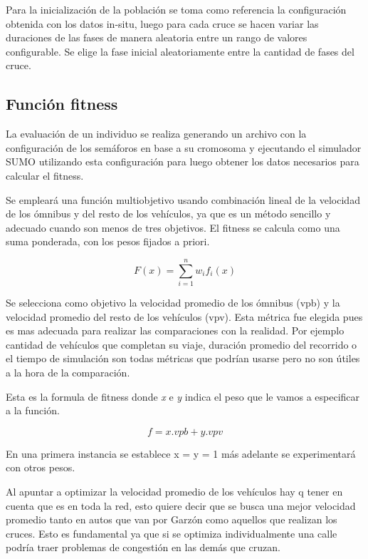 Para la inicialización de la población se toma como referencia
la configuración obtenida con los datos in-situ, luego para cada
cruce se hacen variar las duraciones de las fases de manera aleatoria entre un rango de valores configurable. Se elige la fase inicial aleatoriamente entre la cantidad de fases del cruce.

\subsection{Función fitness}


La evaluación de un individuo se realiza generando un archivo con la configuración de los semáforos en base a su cromosoma y ejecutando el simulador SUMO utilizando esta configuración para luego obtener los datos necesarios para calcular el fitness.

Se empleará una función multiobjetivo usando combinación lineal de la velocidad de los ómnibus y del resto de los vehículos, ya que es un método sencillo y adecuado cuando son menos de tres objetivos. El fitness se calcula como una suma ponderada, con los pesos fijados a priori.

        \begin{equation}
        \label{eq:funcion_fitness_generica}
		F(x) = \sum_{i=1}^{n}{w_i}{f_i}(x)
        \end{equation}

Se selecciona como objetivo la velocidad promedio de los ómnibus (vpb) y la velocidad promedio del resto de los vehículos (vpv). Esta métrica fue elegida pues es mas adecuada para realizar las comparaciones con la realidad. Por ejemplo cantidad de vehículos que completan su viaje, duración promedio del recorrido o el tiempo de simulación son todas métricas que podrían usarse pero no son útiles a la hora de la comparación.

Esta es la formula de fitness donde \emph{x} e \emph{y} indica el peso que le vamos a especificar a la función. 

        \begin{equation}
        \label{eq:funcion_fitness}
        f = x.vpb + y.vpv
        \end{equation}
        
En una primera instancia se establece x = y = 1 más adelante se experimentará con otros pesos.

Al apuntar a optimizar la velocidad promedio de los vehículos hay q tener en cuenta que es en toda la red, esto quiere decir que se busca una mejor velocidad promedio tanto en autos que van por Garzón como aquellos que realizan los cruces. Esto es fundamental ya que si se optimiza individualmente una calle podría traer problemas de congestión en las demás que cruzan.

